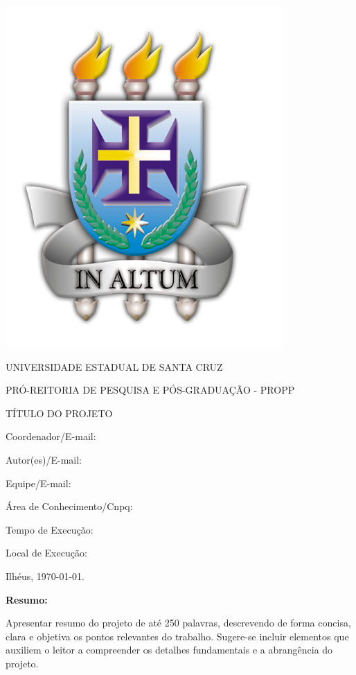 \documentclass[a4paper]{article}
\begin{document}
\begin{center}

    \includegraphics[scale=0.1]{uesct}

    UNIVERSIDADE ESTADUAL DE SANTA CRUZ

    PRÓ-REITORIA DE PESQUISA E PÓS-GRADUAÇÃO - PROPP 

    \vfill

    TÍTULO DO PROJETO

    \vfill
\end{center}

Coordenador/E-mail:

Autor(es)/E-mail:

Equipe/E-mail:

Área de Conhecimento/Cnpq:

Tempo de Execução:

Local de Execução:

\vfill

\begin{center}
    Ilhéus, \today.
\end{center}

\newpage

\textbf{Resumo:}

Apresentar resumo do projeto de até 250 palavras, descrevendo de forma concisa, clara e objetiva os pontos relevantes do trabalho. Sugere-se incluir elementos que auxiliem o leitor a compreender os detalhes fundamentais e a abrangência do projeto.
\end{document}
